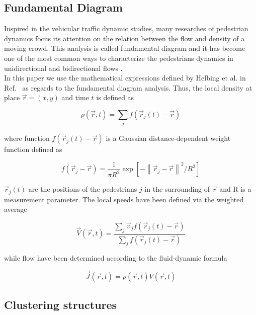 \subsection{\label{fundamental-diagram} Fundamental Diagram}

Inspired in the vehicular traffic dynamic studies, many researches of pedestrian dynamics focus its attention on the relation between the flow and density of a moving crowd. This analysis is called fundamental diagram and it has become one of the most common ways to characterize the pedestrians dynamics in unidirectional and bidirectional flows \cite{fruin1,mori1,polus1,seyfried1,jelic1}. \\

In this paper we use the mathematical expressions defined by Helbing et al. in Ref.~\cite{helbing3} as regards to the fundamental diagram analysis. Thus, the local density at place $\vec{r}=(x,y)$ and time $t$ is defined as

\begin{equation}
\rho(\vec{r},t)=\sum_{j}f(\vec{r}_j(t)-\vec{r}) \label{ec-density}
\end{equation}

where function $f(\vec{r}_j(t)-\vec{r})$ is a Gaussian distance-dependent weight function defined as

\begin{equation}
f(\vec{r}_j-\vec{r})=\frac{1}{\pi R^2}\exp[-\left \| \vec{r}_j-\vec{r} \right \|^2/R^2] \label{ec-f}
\end{equation}

$\vec{r}_j(t)$ are the positions of the pedestrians $j$ in the surrounding of $\vec{r}$ and R is a measurement parameter. 
The local speeds have been defined via the weighted average  

\begin{equation}
\vec{V}(\vec{r},t)=\frac{\sum_j \vec{v}_jf(\vec{r}_j(t)-\vec{r}) }{\sum_j f(\vec{r}_j(t)-\vec{r}) } \label{ec-v}
\end{equation}

while flow have been determined according to the fluid-dynamic formula

\begin{equation}
\vec{J}(\vec{r},t)=\rho(\vec{r},t)V(\vec{r},t) \label{ec-flow}
\end{equation}


\subsection{\label{granular-cluster} Clustering structures}

